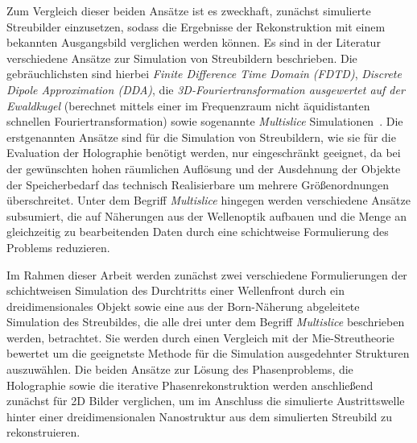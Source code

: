 Zum Vergleich dieser beiden Ansätze ist es zweckhaft, zunächst simulierte Streubilder einzusetzen, sodass die Ergebnisse der Rekonstruktion mit einem bekannten Ausgangsbild verglichen werden können. Es sind in der Literatur verschiedene Ansätze zur Simulation von Streubildern beschrieben. Die gebräuchlichsten sind hierbei \textit{Finite Difference Time Domain (FDTD)}, \textit{Discrete Dipole Approximation (DDA)}, die \textit{3D-Fouriertransformation ausgewertet auf der Ewaldkugel} (berechnet mittels einer im Frequenzraum nicht äquidistanten schnellen Fouriertransformation) sowie sogenannte \textit{Multislice} Simulationen~\cite{drezek1999,sander2014,hantke2016,hare1994,barke2015}. Die erstgenannten Ansätze sind für die Simulation von Streubildern, wie sie für die Evaluation der Holographie benötigt werden, nur eingeschränkt geeignet, da bei der gewünschten hohen räumlichen Auflösung und der Ausdehnung der Objekte der Speicherbedarf das technisch Realisierbare um mehrere Größenordnungen überschreitet. Unter dem Begriff \textit{Multislice} hingegen werden verschiedene Ansätze subsumiert, die auf Näherungen aus der Wellenoptik aufbauen und die Menge an gleichzeitig zu bearbeitenden Daten durch eine schichtweise Formulierung des Problems reduzieren. 

Im Rahmen dieser Arbeit werden zunächst zwei verschiedene Formulierungen der schichtweisen Simulation des Durchtritts einer Wellenfront durch ein dreidimensionales Objekt sowie eine aus der Born-Näherung abgeleitete Simulation des Streubildes, die alle drei unter dem Begriff \textit{Multislice} beschrieben werden, betrachtet. Sie werden durch einen Vergleich mit der Mie-Streutheorie bewertet um die geeignetste Methode für die Simulation ausgedehnter Strukturen auszuwählen. Die beiden Ansätze zur Lösung des Phasenproblems, die Holographie sowie die iterative Phasenrekonstruktion werden anschließend zunächst für 2D Bilder verglichen, um im Anschluss die simulierte Austrittswelle hinter einer dreidimensionalen Nanostruktur aus dem simulierten Streubild zu rekonstruieren.